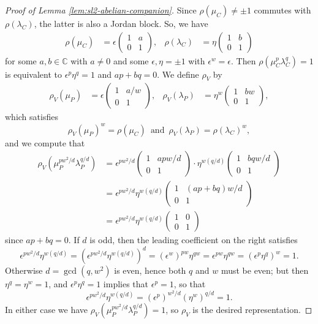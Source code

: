 \documentclass[11pt]{amsart}
\numberwithin{equation}{section}
\numberwithin{theorem}{section}
\theoremstyle{definition}
\newcommand{\C}{\mathbb{C}}
\begin{document}
\begin{proof}[Proof of Lemma \ref{lem:sl2-abelian-companion}]
Since $\rho(\mu_C) \neq \pm1$ commutes with $\rho(\lambda_C)$,  the latter is also a Jordan block. So, we have
\begin{align*}
\rho(\mu_C) &= \epsilon \begin{pmatrix} 1 & a \\ 0 & 1 \end{pmatrix}, &
\rho(\lambda_C) &= \eta \begin{pmatrix} 1 & b \\ 0 & 1 \end{pmatrix}
\end{align*}
for some $a,b\in\C$ with $a\neq 0$ and some $\epsilon,\eta=\pm1$ with $\epsilon^w = \epsilon$.  Then $\rho(\mu_C^p\lambda_C^q)=1$ is equivalent to $\epsilon^p\eta^q=1$ and $ap+bq=0$.  We define $\rho_V$ by
\begin{align*}
\rho_V(\mu_P) &= \epsilon \begin{pmatrix} 1 & a/w \\ 0 & 1 \end{pmatrix}, &
\rho_V(\lambda_P) &= \eta^w \begin{pmatrix} 1 & bw \\ 0 & 1 \end{pmatrix},
\end{align*}
which satisfies \[\rho_V(\mu_P)^w = \rho(\mu_C) \, \textrm{ and }\,\rho_V(\lambda_P) = \rho(\lambda_C)^w,\] and we compute that
\begin{align*}
\rho_V(\mu_P^{pw^2/d}\lambda_P^{q/d}) &= \epsilon^{pw^2/d} \begin{pmatrix} 1 & apw/d \\ 0 & 1 \end{pmatrix} \cdot \eta^{w(q/d)} \begin{pmatrix} 1 & bqw/d \\ 0 & 1 \end{pmatrix} \\
&= \epsilon^{pw^2/d}\eta^{w(q/d)} \begin{pmatrix} 1 & (ap+bq)w/d \\ 0 & 1 \end{pmatrix} \\
&= \epsilon^{pw^2/d}\eta^{w(q/d)} \begin{pmatrix} 1 & 0 \\ 0 & 1 \end{pmatrix}
\end{align*}
since $ap+bq=0$.  If $d$ is odd, then the leading coefficient on the right satisfies
\[ \epsilon^{pw^2/d}\eta^{w(q/d)} = \left(\epsilon^{pw^2/d}\eta^{w(q/d)}\right)^d = (\epsilon^w)^{pw} \eta^{qw} = \epsilon^{pw}\eta^{qw} = (\epsilon^p\eta^q)^w = 1. \]
Otherwise $d=\gcd(q,w^2)$ is even, hence both $q$ and $w$ must be even; but then $\eta^q = \eta^w=1$, and $\epsilon^p\eta^q=1$ implies that $\epsilon^p=1$, so that
\[ \epsilon^{pw^2/d}\eta^{w(q/d)} = (\epsilon^p)^{w^2/d} (\eta^w)^{q/d} = 1. \]
In either case we have $\rho_V(\mu_P^{pw^2/d}\lambda_P^{q/d}) = 1$, so $\rho_V$ is the desired representation.


\end{proof}
\end{document}
